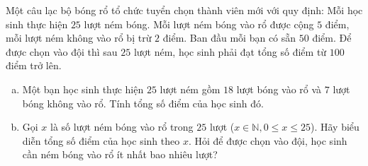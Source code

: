 \begin{bt}%
Một câu lạc bộ bóng rổ tổ chức tuyển chọn thành viên mới với quy định: Mỗi học sinh thực hiện $25$ lượt ném bóng. Mỗi lượt ném bóng vào rổ được cộng $5$ điểm, mỗi lượt ném không vào rổ bị trừ $2$ điểm. Ban đầu mỗi bạn có sẵn $50$ điểm. Để được chọn vào đội thì sau $25$ lượt ném, học sinh phải đạt tổng số điểm từ $100$ điểm trở lên.
\begin{enumerate}[a)]
	\item Một bạn học sinh thực hiện $25$ lượt ném gồm $18$ lượt bóng vào rổ và $7$ lượt bóng không vào rổ. Tính tổng số điểm của học sinh đó.
	\item Gọi $x$ là số lượt ném bóng vào rổ trong $25$ lượt ($x \in \mathbb{N}, 0 \le x \le 25$). Hãy biểu diễn tổng số điểm của học sinh theo $x$. Hỏi để được chọn vào đội, học sinh cần ném bóng vào rổ ít nhất bao nhiêu lượt?
\end{enumerate}
\end{bt}

